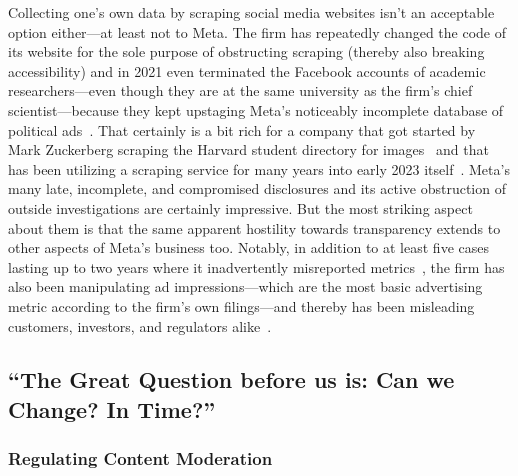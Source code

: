 Collecting one's own data by scraping social media websites isn't an acceptable
option either---at least not to Meta. The firm has repeatedly changed the code
of its website for the sole purpose of obstructing scraping (thereby also
breaking accessibility) and in 2021 even terminated the Facebook accounts of
academic researchers---even though they are at the same university as the firm's
chief  scientist---because they kept upstaging Meta's noticeably incomplete
database of political
ads~\cite{EdelsonMcCoy2021a,Faife2021a,MerrillTobin2019,Roose2021a}. That
certainly is a bit rich for a company that got started by Mark Zuckerberg
scraping the Harvard student directory for images~\cite{Madrigal2019} and that
has been utilizing a scraping service for many years into early 2023
itself~\cite{Newman2023}. Meta's many late, incomplete, and compromised
disclosures and its active obstruction of outside investigations are certainly
impressive. But the most striking aspect about them is that the same apparent
hostility towards transparency extends to other aspects of Meta's business too.
Notably, in addition to at least five cases lasting up to two years where it
inadvertently misreported
metrics~\cite{BruellPatel2020,Hutchinson2016,Hutchinson2016a,Hutchinson2016b,Hutchinson2017,VranicaMarshall2016},
the firm has also been manipulating ad impressions---which are the most basic
advertising metric according to the firm's own  filings---and thereby has
been misleading customers, investors, and regulators alike~\cite{Grimm2022a}.


\let\Oldthefootnote\thefootnote
\renewcommand*{\thefootnote}{\ding{164}}
\subsection{``The Great Question before us is: Can we Change? In Time?''%
\texorpdfstring{\>\!\protect\footnotemark}{}}
\let\thefootnote\Oldthefootnote

\subsubsection{Regulating Content Moderation}
\label{sec:regulating:moderation}

